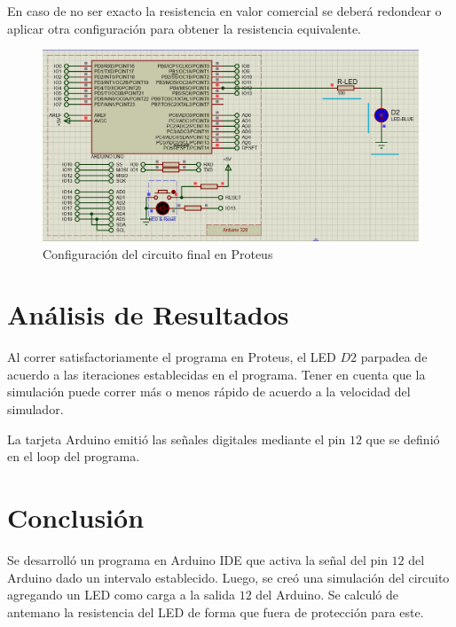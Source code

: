 \documentclass{article}
\begin{document}
    En caso de no ser exacto la resistencia en valor comercial se deberá
    redondear o aplicar otra configuración para obtener la resistencia
    equivalente.

    \begin{figure}[H]
        \centering
        \includegraphics[width=0.5\paperwidth]{images/sim-2}
        \caption{Configuración del circuito final en Proteus}\label{fig:figure5}
    \end{figure}

    \section{Análisis de Resultados}\label{sec:análisis-de-resultados}

    Al correr satisfactoriamente el programa en Proteus, el LED $D2$ parpadea
    de acuerdo a las iteraciones establecidas en el programa. Tener en cuenta
    que la simulación puede correr más o menos rápido de acuerdo a la
    velocidad del simulador.

    \bigbreak

    La tarjeta Arduino emitió las señales digitales mediante el pin $12$ que
    se definió en el loop del programa.

    \section{Conclusión}\label{sec:conclusion}

    Se desarrolló un programa en Arduino IDE que activa la señal del pin $12$
    del Arduino dado un intervalo establecido. Luego, se creó una simulación
    del circuito agregando un LED como carga a la salida $12$ del Arduino. Se
    calculó de antemano la resistencia del LED de forma que fuera de
    protección para este.

    \printbibliography
\end{document}
